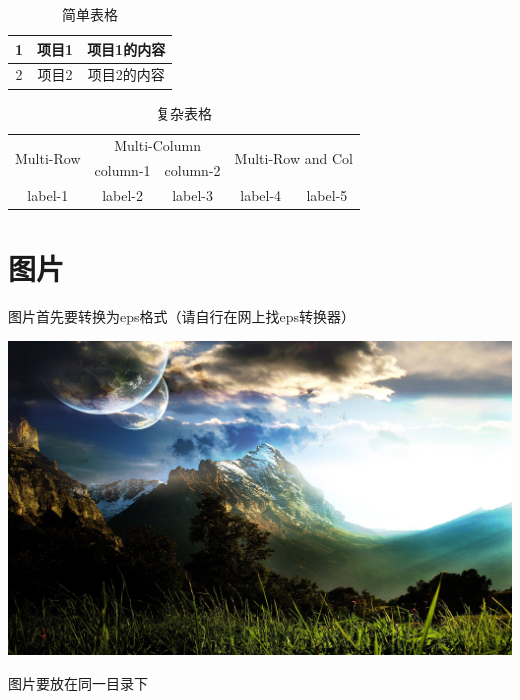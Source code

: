 \documentclass{article} %
\begin{document}
\begin{CJK}{UTF8}{gbsn}
\begin{table}[h] %
\centering %
\caption{简单表格} %
\begin{tabular}{|c|c|c|} %
\hline %
1 & 项目1 & 项目1的内容 \\ %
\hline
2 & 项目2 & 项目2的内容 \\
\hline
\end{tabular}
\end{table}

\begin{table}[h]
\centering
\caption{复杂表格} 
\begin{tabular}{|c|c|c|c|c|}
\hline 
\multirow{2}{*}{Multi-Row} &
\multicolumn{2}{c|}{Multi-Column} &
\multicolumn{2}{c|}{\multirow{2}{*}{Multi-Row and Col}} \\
\cline{2-3} %
 & column-1 & column-2 & \multicolumn{2}{c|}{} \\
\hline
label-1 & label-2 & label-3 & label-4 & label-5 \\
\hline
\end{tabular}
\end{table}

\section{图片}
图片首先要转换为eps格式（请自行在网上找eps转换器）

\includegraphics[scale=0.2]{figure2.eps} %

图片要放在同一目录下

\end{CJK}
\end{document}
